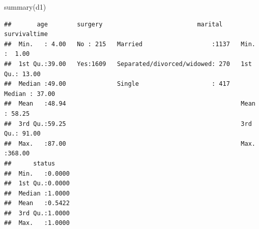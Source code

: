 \documentclass[
  10pt,
]{krantz}
\newenvironment{Shaded}{\begin{snugshade}}{\end{snugshade}}
\newcommand{\FunctionTok}[1]{\textcolor[rgb]{0.00,0.00,0.00}{#1}}
\newcommand{\NormalTok}[1]{#1}
\begin{document}
\begin{Shaded}
\begin{Highlighting}[]
\FunctionTok{summary}\NormalTok{(d1)}
\end{Highlighting}
\end{Shaded}

\begin{verbatim}
##       age        surgery                          marital      survivaltime   
##  Min.   : 4.00   No : 215   Married                   :1137   Min.   :  1.00  
##  1st Qu.:39.00   Yes:1609   Separated/divorced/widowed: 270   1st Qu.: 13.00  
##  Median :49.00              Single                    : 417   Median : 37.00  
##  Mean   :48.94                                                Mean   : 58.25  
##  3rd Qu.:59.25                                                3rd Qu.: 91.00  
##  Max.   :87.00                                                Max.   :368.00  
##      status      
##  Min.   :0.0000  
##  1st Qu.:0.0000  
##  Median :1.0000  
##  Mean   :0.5422  
##  3rd Qu.:1.0000  
##  Max.   :1.0000
\end{verbatim}
\end{document}
